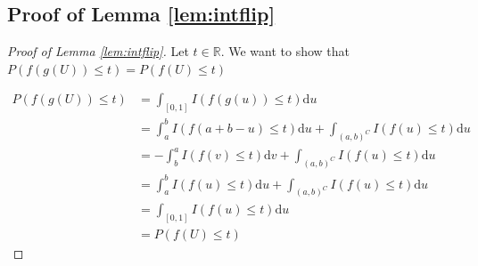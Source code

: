 \documentclass[12pt]{article}
\theoremstyle{plain}%
\theoremstyle{definition}
\def\d{\mathrm{d}}
\begin{document}
\subsection{Proof of Lemma \ref{lem:intflip}}\label{sec:intflip}
	\begin{proof}[Proof of Lemma \ref{lem:intflip}]\label{pf:intflip}
	Let $t\in \mathbb{R}$. We want to show that $P(f(g(U))\leq t)=P(f(U)\leq t)$
	
	\begin{align*}
		P(f(g(U))\leq t)&=\int_{[0,1]}I(f(g(u))\leq t) \d u\\
		&= \int_{a}^bI(f(a+b-u)\leq t) \d u + \int_{(a,b)^C}I(f(u)\leq t) \d u\\
		&= -\int_{b}^aI(f(v)\leq t) \d v + \int_{(a,b)^C}I(f(u)\leq t) \d u\\
		&= \int_{a}^bI(f(u)\leq t) \d u + \int_{(a,b)^C}I(f(u)\leq t) \d u\\
		&= \int_{[0,1]} I(f(u)\leq t) \d u \\
		&= P(f(U)\leq t)
	\end{align*}
\end{proof}
\end{document}
